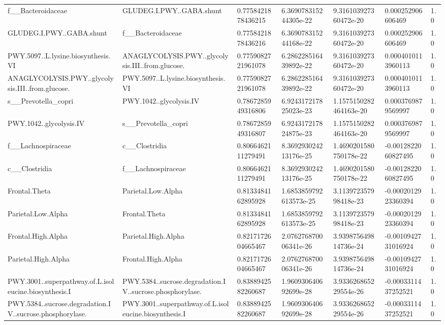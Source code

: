 \begin{longtable}{lllllll}
f\_\_Bacteroidaceae & GLUDEG.I.PWY..GABA.shunt & 0.7758421878436215 & 6.369078315244305e-22 & 9.316103927360472e-20 & 0.000252906606469 & 1.0 \\
GLUDEG.I.PWY..GABA.shunt & f\_\_Bacteroidaceae & 0.7758421878436216 & 6.369078315244168e-22 & 9.316103927360472e-20 & 0.000252906606469 & 1.0 \\
PWY.5097..L.lysine.biosynthesis.VI & ANAGLYCOLYSIS.PWY..glycolysis.III..from.glucose. & 0.7759082721961078 & 6.286228516439892e-22 & 9.316103927360472e-20 & 0.0004010113960113 & 1.0 \\
ANAGLYCOLYSIS.PWY..glycolysis.III..from.glucose. & PWY.5097..L.lysine.biosynthesis.VI & 0.7759082721961078 & 6.286228516439892e-22 & 9.316103927360472e-20 & 0.0004010113960113 & 1.0 \\
s\_\_Prevotella\_copri & PWY.1042..glycolysis.IV & 0.7867285949316806 & 6.924317217825023e-23 & 1.1575150282464163e-20 & 0.0003769879569997 & 1.0 \\
PWY.1042..glycolysis.IV & s\_\_Prevotella\_copri & 0.7867285949316807 & 6.924317217824875e-23 & 1.1575150282464163e-20 & 0.0003769879569997 & 1.0 \\
f\_\_Lachnospiraceae & c\_\_Clostridia & 0.8066462111279491 & 8.369293024213176e-25 & 1.4690201580750178e-22 & -0.0012822060827495 & 1.0 \\
c\_\_Clostridia & f\_\_Lachnospiraceae & 0.8066462111279491 & 8.369293024213176e-25 & 1.4690201580750178e-22 & -0.0012822060827495 & 1.0 \\
Frontal.Theta & Parietal.Low.Alpha & 0.8133484162895928 & 1.6853859792613573e-25 & 3.113972357998418e-23 & -0.0002012923360394 & 1.0 \\
Parietal.Low.Alpha & Frontal.Theta & 0.8133484162895928 & 1.6853859792613573e-25 & 3.113972357998418e-23 & -0.0002012923360394 & 1.0 \\
Frontal.High.Alpha & Parietal.High.Alpha & 0.8217172604665467 & 2.076276870006341e-26 & 3.939875649814736e-24 & -0.0010942731016924 & 1.0 \\
Parietal.High.Alpha & Frontal.High.Alpha & 0.8217172604665467 & 2.076276870006341e-26 & 3.939875649814736e-24 & -0.0010942731016924 & 1.0 \\
PWY.3001..superpathway.of.L.isoleucine.biosynthesis.I & PWY.5384..sucrose.degradation.IV..sucrose.phosphorylase. & 0.8388942582260687 & 1.960930640692699e-28 & 3.933626865229554e-26 & -0.0003311437252521 & 1.0 \\
PWY.5384..sucrose.degradation.IV..sucrose.phosphorylase. & PWY.3001..superpathway.of.L.isoleucine.biosynthesis.I & 0.8388942582260687 & 1.960930640692699e-28 & 3.933626865229554e-26 & -0.0003311437252521 & 1.0 \\

\end{longtable}
